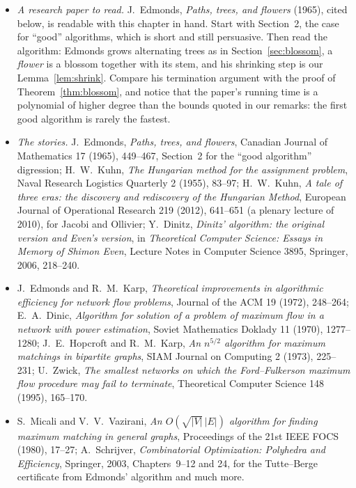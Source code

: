 \begin{itemize}
\item \emph{A research paper to read.} J.~Edmonds, \emph{Paths, trees, and flowers} (1965), cited below, is readable with this chapter in hand. Start with Section~2, the case for ``good'' algorithms, which is short and still persuasive.
Then read the algorithm: Edmonds grows alternating trees as in Section~\ref{sec:blossom}, a \emph{flower} is a blossom together with its stem, and his shrinking step is our Lemma~\ref{lem:shrink}. Compare his termination argument with the proof of
Theorem~\ref{thm:blossom}, and notice that the paper's running time is a polynomial of higher degree than the bounds quoted in our remarks: the first good algorithm is rarely the fastest.
\item \emph{The stories.} J.~Edmonds, \emph{Paths, trees, and flowers}, Canadian Journal of Mathematics 17 (1965), 449--467, Section~2 for the ``good algorithm'' digression; H.~W.~Kuhn, \emph{The Hungarian method for the assignment problem}, Naval Research Logistics Quarterly 2 (1955), 83--97;
H.~W.~Kuhn, \emph{A tale of three eras: the discovery and rediscovery of the Hungarian Method}, European Journal of Operational Research 219 (2012), 641--651 (a plenary lecture of 2010), for Jacobi and Ollivier; Y.~Dinitz, \emph{Dinitz' algorithm: the original version and Even's version}, in
\emph{Theoretical Computer Science: Essays in Memory of Shimon Even}, Lecture Notes in Computer Science 3895, Springer, 2006, 218--240.
\item J.~Edmonds and R.~M.~Karp, \emph{Theoretical improvements in algorithmic efficiency for network flow problems}, Journal of the ACM 19 (1972), 248--264; E.~A.~Dinic, \emph{Algorithm for solution of a problem of maximum flow in a network with power estimation}, Soviet Mathematics Doklady 11 (1970),
1277--1280; J.~E.~Hopcroft and R.~M.~Karp, \emph{An $n^{5/2}$ algorithm for maximum matchings in bipartite graphs}, SIAM Journal on Computing 2 (1973), 225--231; U.~Zwick, \emph{The smallest networks on which the Ford--Fulkerson maximum flow procedure may fail to terminate}, Theoretical Computer Science 148 (1995), 165--170.
\item S.~Micali and V.~V.~Vazirani, \emph{An $O(\sqrt{|V|}\,|E|)$ algorithm for finding maximum matching in general graphs}, Proceedings of the 21st IEEE FOCS (1980), 17--27; A.~Schrijver, \emph{Combinatorial Optimization: Polyhedra and Efficiency}, Springer, 2003, Chapters~9--12 and 24, for the Tutte--Berge
certificate from Edmonds' algorithm and much more.

\end{itemize}
